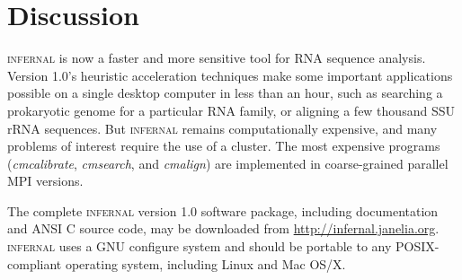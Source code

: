 \section{Discussion}

\textsc{infernal} is now a faster and more sensitive tool for RNA
sequence analysis.  Version 1.0's heuristic acceleration techniques
make some important applications possible on a single desktop computer
in less than an hour, such as searching a prokaryotic genome for a
particular RNA family, or aligning a few thousand SSU rRNA sequences.
But \textsc{infernal} remains computationally expensive, and many
problems of interest require the use of a cluster.  The most expensive
programs (\emph{cmcalibrate}, \emph{cmsearch}, and \emph{cmalign}) are
implemented in coarse-grained parallel MPI versions.







The complete \textsc{infernal} version 1.0 software package, including
documentation and ANSI C source code, may be downloaded from
\url{http://infernal.janelia.org}. \textsc{infernal} uses a GNU
configure system and should be portable to any POSIX-compliant
operating system, including Linux and Mac OS/X.
